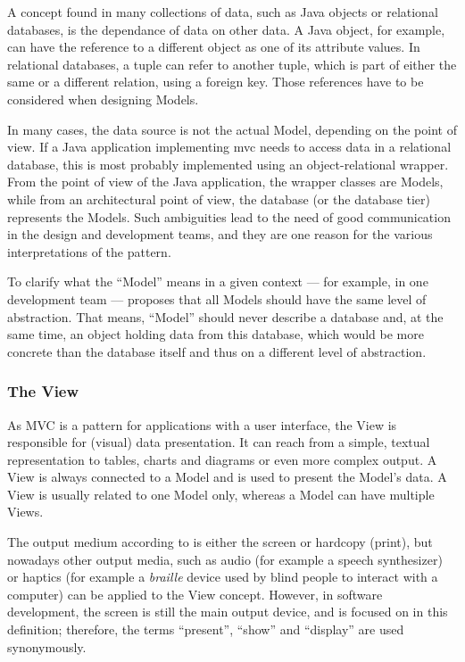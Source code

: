 A concept found in many collections of data, such as Java objects or relational databases, is the dependance of data on other data. A Java object, for example, can have the reference to a different object as one of its attribute values. In relational databases, a \gls{tuple} can refer to another tuple, which is part of either the same or a different \gls{relation}, using a foreign key. Those references have to be considered when designing Models.

In many cases, the data source is not the actual Model, depending on the point of view. If a Java application implementing \acl{mvc} needs to access data in a relational database, this is most probably implemented using an object-relational wrapper. From the point of view of the Java application, the wrapper classes are Models, while from an architectural point of view, the database (or the database tier) represents the Models. Such ambiguities lead to the need of good communication in the design and development teams, and they are one reason for the various interpretations of the pattern.

To clarify what the ``Model'' means in a given context --- for example, in one development team ---  proposes that all Models should have the same level of abstraction. That means, ``Model'' should never describe a database and, at the same time, an object holding data from this database, which would be more concrete than the database itself and thus on a different level of abstraction.

\subsubsection{The View}
As MVC is a pattern for applications with a user interface, the View is responsible for (visual) data presentation. It can reach from a simple, textual representation to tables, charts and diagrams or even more complex output. A View is always connected to a Model and is used to present the Model's data. A View is usually related to one Model only, whereas a Model can have multiple Views.

The output medium according to  is either the screen or hardcopy (print), but nowadays other output media, such as audio (for example a speech synthesizer) or haptics (for example a \emph{braille} device used by blind people to interact with a computer) can be applied to the View concept. However, in software development, the screen is still the main output device, and is focused on in this definition; therefore, the terms ``present'', ``show'' and ``display'' are used synonymously.

